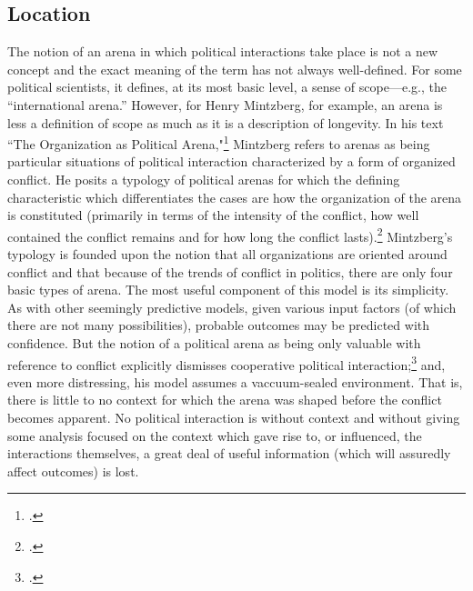 \documentclass{article}
\begin{document}
\subsection{Location}
The notion of an arena in which political interactions take place is not a new concept and the exact meaning of the term has not always well-defined. 
For some political scientists, it defines, at its most basic level, a sense of scope---e.g., the ``international arena.'' 
However, for Henry Mintzberg, for example, an arena is less a definition of scope as much as it is a description of longevity. 
In his text ``The Organization as Political Arena,"\footcite{mintzberg85} Mintzberg refers to arenas as being particular situations of political interaction characterized by a form of organized conflict. 
He posits a typology of political arenas for which the defining characteristic which differentiates the cases are how the organization of the arena is constituted (primarily in terms of the intensity of the conflict, how well contained the conflict remains and for how long the conflict lasts).\footcite[141]{mintzberg85} 
Mintzberg's typology is founded upon the notion that all organizations are oriented around conflict and that because of the trends of conflict in politics, there are only four basic types of arena. 
The most useful component of this model is its simplicity. 
As with other seemingly predictive models, given various input factors (of which there are not many possibilities), probable outcomes may be predicted with confidence. 
But the notion of a political arena as being only valuable with reference to conflict explicitly dismisses cooperative political interaction;\footcite[152]{mintzberg85} and, even more distressing, his model assumes a vaccuum-sealed environment. 
That is, there is little to no context for which the arena was shaped before the conflict becomes apparent. 
No political interaction is without context and without giving some analysis focused on the context which gave rise to, or influenced, the interactions themselves, a great deal of useful information (which will assuredly affect outcomes) is lost.
\end{document}
